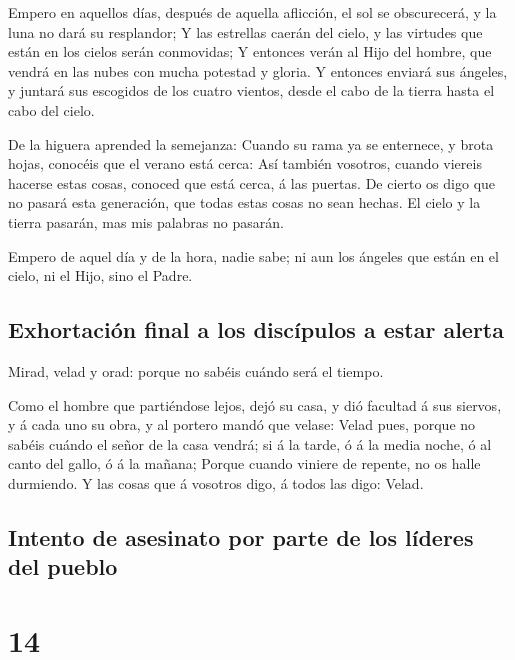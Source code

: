  Empero en aquellos días, después de aquella aflicción,
el sol se obscurecerá, y la luna no dará su resplandor; 
Y las estrellas caerán del cielo, y las virtudes que están en los cielos
serán conmovidas;  Y entonces verán al Hijo del hombre,
que vendrá en las nubes con mucha potestad y gloria.  Y
entonces enviará sus ángeles, y juntará sus escogidos de los cuatro
vientos, desde el cabo de la tierra hasta el cabo del cielo.

 De la higuera aprended la semejanza: Cuando su rama ya
se enternece, y brota hojas, conocéis que el verano está cerca:
 Así también vosotros, cuando viereis hacerse estas
cosas, conoced que está cerca, á las puertas.  De cierto
os digo que no pasará esta generación, que todas estas cosas no sean
hechas.  El cielo y la tierra pasarán, mas mis palabras
no pasarán.

 Empero de aquel día y de la hora, nadie sabe; ni aun los
ángeles que están en el cielo, ni el Hijo, sino el Padre.

\hypertarget{exhortaciuxf3n-final-a-los-discuxedpulos-a-estar-alerta}{%
\subsection{Exhortación final a los discípulos a estar
alerta}\label{exhortaciuxf3n-final-a-los-discuxedpulos-a-estar-alerta}}

 Mirad, velad y orad: porque no sabéis cuándo será el
tiempo.

 Como el hombre que partiéndose lejos, dejó su casa, y
dió facultad á sus siervos, y á cada uno su obra, y al portero mandó que
velase:  Velad pues, porque no sabéis cuándo el señor de
la casa vendrá; si á la tarde, ó á la media noche, ó al canto del gallo,
ó á la mañana;  Porque cuando viniere de repente, no os
halle durmiendo.  Y las cosas que á vosotros digo, á
todos las digo: Velad.

\hypertarget{intento-de-asesinato-por-parte-de-los-luxedderes-del-pueblo}{%
\subsection{Intento de asesinato por parte de los líderes del
pueblo}\label{intento-de-asesinato-por-parte-de-los-luxedderes-del-pueblo}}

\hypertarget{section-13}{%
\section{14}\label{section-13}}

